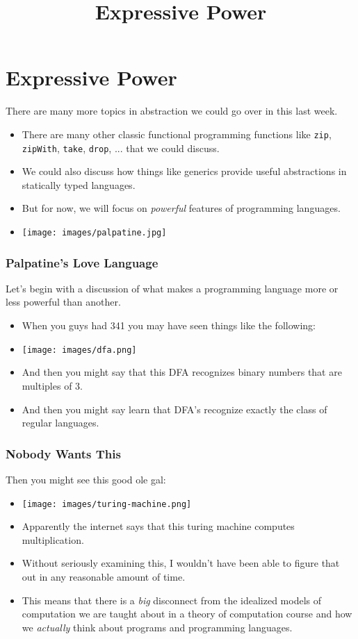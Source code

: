 \documentclass{beamer}
\title{Expressive Power}
\begin{document}
\begin{frame}
\titlepage
\end{frame}
\section{Expressive Power}
\begin{frame}
  There are many more topics in abstraction we could go over in this last week.
  \begin{itemize}
  \item<2-> There are many other classic functional programming functions like \texttt{zip}, \texttt{zipWith}, \texttt{take},
    \texttt{drop}, ... that we could discuss.
  \item<3-> We could also discuss how things like generics provide useful abstractions in statically typed languages.
  \item<4-> But for now, we will focus on \emph{powerful} features of programming languages.
  \item<5-> \texttt{[image: images/palpatine.jpg]}
  \end{itemize}
\end{frame}

\begin{frame}
  \frametitle{Palpatine's Love Language}
  Let's begin with a discussion of what makes a programming language more or less powerful than another.
  \begin{itemize}
  \item<2-> When you guys had 341 you may have seen things like the following:
  \item<3-> \texttt{[image: images/dfa.png]}
  \item<4-> And then you might say that this DFA recognizes binary numbers that are multiples of 3.
  \item<5-> And then you might say learn that DFA's recognize exactly the class of regular languages.  
  \end{itemize}
\end{frame}

\begin{frame}
  \frametitle{Nobody Wants This}
  Then you might see this good ole gal:
  \begin{itemize}
  \item<2-> \texttt{[image: images/turing-machine.png]}
  \item<3-> Apparently the internet says that this turing machine computes multiplication.
  \item<4-> Without seriously examining this, I wouldn't have been able to figure that out
    in any reasonable amount of time.
  \item<5-> This means that there is a \emph{big} disconnect from the idealized models of
    computation we are taught about in a theory of computation course and how we \emph{actually}
    think about programs and programming languages.
  \end{itemize}

\end{frame}
\end{document}
